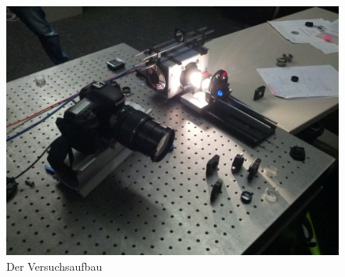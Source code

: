 \begin{figure}[h!]
	\includegraphics[width=\linewidth]{img/Versuchsaufbau.jpg}
	\caption{Der Versuchsaufbau}
	\label{fig:versuchsaufbaureal}
\end{figure}